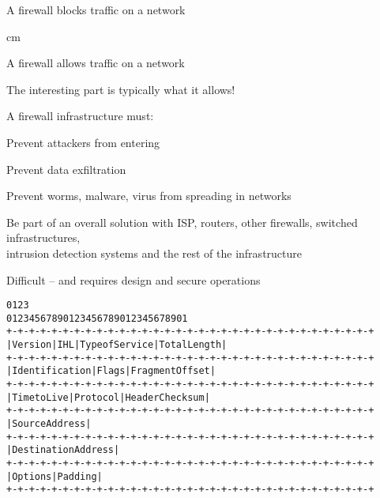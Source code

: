 \documentclass[Screen16to9,17pt]{foils}
\begin{document}


\centerline{\hlkbig A firewall {\color{security6blue}blocks traffic} on a network}

 cm
\pause

\centerline{\hlkbig A firewall {\color{red}allows traffic} on a network}
{\small The interesting part is typically what it allows!}

\begin{list1}
\item A firewall infrastructure must:
\begin{list2}
\item Prevent attackers from entering
\item Prevent data exfiltration
\item Prevent worms, malware, virus from spreading in networks
\item Be part of an overall solution with ISP, routers, other firewalls, switched infrastructures,\\
  intrusion detection systems and the rest of the infrastructure
\end{list2}
\end{list1}

\vskip 5mm
\centerline{Difficult -- and requires design and secure operations}




\begin{alltt}\footnotesize
0                   1                   2                   3
0 1 2 3 4 5 6 7 8 9 0 1 2 3 4 5 6 7 8 9 0 1 2 3 4 5 6 7 8 9 0 1
+-+-+-+-+-+-+-+-+-+-+-+-+-+-+-+-+-+-+-+-+-+-+-+-+-+-+-+-+-+-+-+-+
|Version|  IHL  |Type of Service|          Total Length         |
+-+-+-+-+-+-+-+-+-+-+-+-+-+-+-+-+-+-+-+-+-+-+-+-+-+-+-+-+-+-+-+-+
|         Identification        |Flags|      Fragment Offset    |
+-+-+-+-+-+-+-+-+-+-+-+-+-+-+-+-+-+-+-+-+-+-+-+-+-+-+-+-+-+-+-+-+
|  Time to Live |    Protocol   |         Header Checksum       |
+-+-+-+-+-+-+-+-+-+-+-+-+-+-+-+-+-+-+-+-+-+-+-+-+-+-+-+-+-+-+-+-+
|                       Source Address                          |
+-+-+-+-+-+-+-+-+-+-+-+-+-+-+-+-+-+-+-+-+-+-+-+-+-+-+-+-+-+-+-+-+
|                    Destination Address                        |
+-+-+-+-+-+-+-+-+-+-+-+-+-+-+-+-+-+-+-+-+-+-+-+-+-+-+-+-+-+-+-+-+
|                    Options                    |    Padding    |
+-+-+-+-+-+-+-+-+-+-+-+-+-+-+-+-+-+-+-+-+-+-+-+-+-+-+-+-+-+-+-+-+
\end{alltt}
\end{document}
